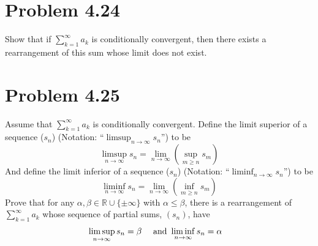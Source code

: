 \documentclass[12pt]{report}
\begin{document}
\section{Problem 4.24}
    Show that if $\sum_{k = 1}^{\infty} a_k$ is conditionally convergent, then there exists a rearrangement of this sum whose limit does not exist. 
    \pagebreak

\section{Problem 4.25}
    Assume that $\sum_{k = 1}^{\infty} a_k$ is conditionally convergent. 
    Define the limit superior of a sequence ($s_n$) (Notation: ``$\limsup_{n \to \infty} s_n$'') to be 
    \[
        \limsup_{n \to \infty} s_n = \lim_{n \to \infty} \left( \sup_{m \geq n} s_m \right)
    \]
    And define the limit inferior of a sequence ($s_n$) (Notation: ``$\liminf_{n \to \infty} s_n$'') to be 
    \[
        \liminf_{n \to \infty} s_n = \lim_{n \to \infty} \left( \inf_{m \geq n} s_m \right)
    \]
    Prove that for any $\alpha, \beta \in \mathbb{R} \cup \{\pm \infty\}$ with $\alpha \leq \beta$, there is a rearrangement of $\sum_{k = 1}^{\infty} a_k$ whose sequence of partial sums, $(s_n)$, have 
    \begin{align*}
        &\limsup_{n \to \infty} s_n = \beta &\text{ and } &\liminf_{n \to \infty} s_n = \alpha
    \end{align*}
\end{document}
